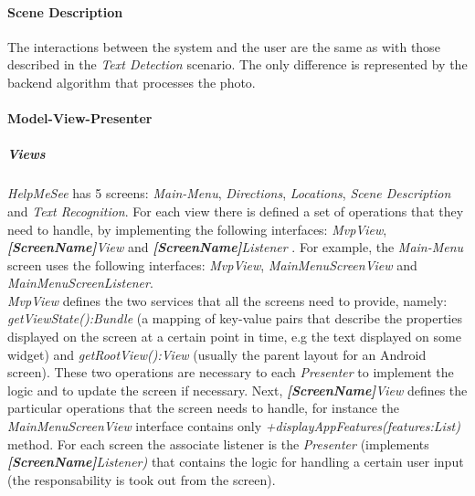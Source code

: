 \documentclass{article}[11]
\begin{document}
	\paragraph{Scene Description\\}
	
		The interactions between the system and the user are the same as with those described in the \emph{Text Detection} scenario. The only difference is represented by the backend algorithm that processes the photo.


	


	

 \paragraph{Model-View-Presenter\\}
 
 \subparagraph{Views\\}
 
   \emph{HelpMeSee} has 5 screens: \emph{Main-Menu}, \emph{Directions}, \emph{Locations}, \emph{Scene Description} and \emph{Text Recognition}. For each view there is defined a set of operations  that they need to handle, by implementing the following interfaces: \emph{MvpView}, \emph{\textbf{[ScreenName]}View} and \emph{\textbf{[ScreenName]}Listener} . For example, the \emph{Main-Menu} screen uses the following interfaces: \emph{MvpView}, \emph{MainMenuScreenView} and \emph{MainMenuScreenListener}. \\
   
   \emph{MvpView} defines the two services that all the screens need to provide, namely: \emph{getViewState():Bundle} (a mapping of key-value pairs that describe the properties displayed on the screen at a certain point in time, e.g the text displayed on some widget) and \emph{getRootView():View} (usually the parent layout for an Android screen). These two operations are necessary to each \emph{Presenter} to implement the logic and to update the screen if necessary. Next, \emph{\textbf{[ScreenName]}View} defines the particular operations that the screen needs to handle, for instance the \emph{MainMenuScreenView} interface contains only \emph{+displayAppFeatures(features:List)} method. For each screen the associate listener is the \emph{Presenter} (implements \emph{\textbf{[ScreenName]}Listener)} that contains the logic for handling a certain user input (the responsability is took out from the screen).\\
      
\end{document}
